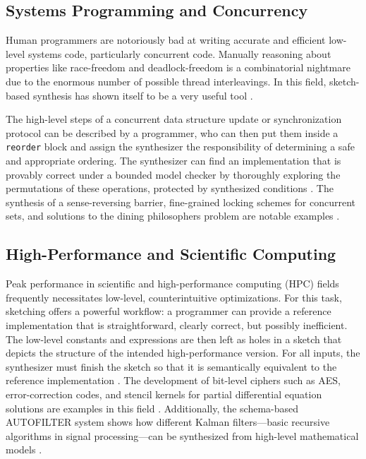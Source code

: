 \documentclass[12pt, a4paper]{report}
\begin{document}
\subsection{Systems Programming and Concurrency}
Human programmers are notoriously bad at writing accurate and efficient low-level systems code, particularly concurrent code. Manually reasoning about properties like race-freedom and deadlock-freedom is a combinatorial nightmare due to the enormous number of possible thread interleavings. In this field, sketch-based synthesis has shown itself to be a very useful tool \citep{solar2008program}.

The high-level steps of a concurrent data structure update or synchronization protocol can be described by a programmer, who can then put them inside a \texttt{reorder} block and assign the synthesizer the responsibility of determining a safe and appropriate ordering. The synthesizer can find an implementation that is provably correct under a bounded model checker by thoroughly exploring the permutations of these operations, protected by synthesized conditions \citep{solar2008program}. The synthesis of a sense-reversing barrier, fine-grained locking schemes for concurrent sets, and solutions to the dining philosophers problem are notable examples \citep{solar2008combinatorial, solar2008program}.

\subsection{High-Performance and Scientific Computing}
Peak performance in scientific and high-performance computing (HPC) fields frequently necessitates low-level, counterintuitive optimizations. For this task, sketching offers a powerful workflow: a programmer can provide a reference implementation that is straightforward, clearly correct, but possibly inefficient. The low-level constants and expressions are then left as holes in a sketch that depicts the structure of the intended high-performance version. For all inputs, the synthesizer must finish the sketch so that it is semantically equivalent to the reference implementation \citep{solar2013sketch}. The development of bit-level ciphers such as AES, error-correction codes, and stencil kernels for partial differential equation solutions are examples in this field \citep{solar2008combinatorial, solar2013sketch}. Additionally, the schema-based AUTOFILTER system shows how different Kalman filters—basic recursive algorithms in signal processing—can be synthesized from high-level mathematical models \citep{fischer2003autobayes}.
\end{document}
